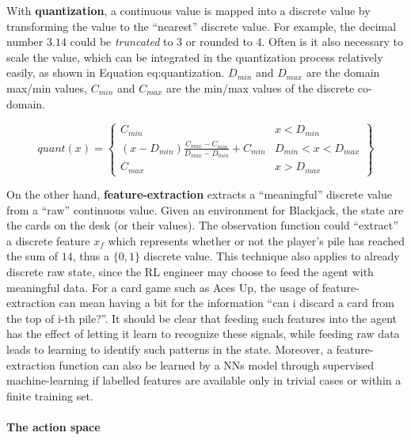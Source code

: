 With \textbf{quantization}, a continuous value is mapped into a discrete value by transforming the value to the ``nearest'' discrete value. For example, the decimal number $3.14$ could be \textit{truncated} to $3$ or rounded to $4$. Often is it also necessary to scale the value, which can be integrated in the quantization process relatively easily, as shown in Equation {eq:quantization}. $D_{min}$ and $D_{max}$ are the domain max/min values, $C_{min}$ and $C_{max}$ are the min/max values of the discrete co-domain.

\begin{equation}
  \label{eq:quantization}
  quant(x) = \left\{
  \begin{array}{cl}
  C_{min} & x < D_{min} \\
  (x - D_{min}) \frac{C_{max} - C_{min}} {D_{max} - D_{min}} + C_{min} & D_{min} < x < D_{max} \\
  C_{max} & x > D_{max}
  \end{array}
  \right\}
\end{equation}

      On the other hand, \textbf{feature-extraction} extracts a ``meaningful'' discrete value from a ``raw'' continuous value. Given an environment for Blackjack, the state are the cards on the desk (or their values). The observation function could ``extract'' a discrete feature $x_f$ which represents whether or not the player's pile has reached the sum of $14$, thus a $\{0,1\}$ discrete value. This technique also applies to already discrete raw state, since the RL engineer may choose to feed the agent with meaningful data. For a card game such as Aces Up, the usage of feature-extraction can mean having a bit for the information ``can i discard a card from the top of i-th pile?''. It should be clear that feeding such features into the agent has the effect of letting it learn to recognize these signals, while feeding raw data leads to learning to identify such patterns in the state. Moreover, a feature-extraction function can also be learned by a NNs model through supervised machine-learning if labelled features are available only in trivial cases or within a finite training set.

\paragraph{The action space}

